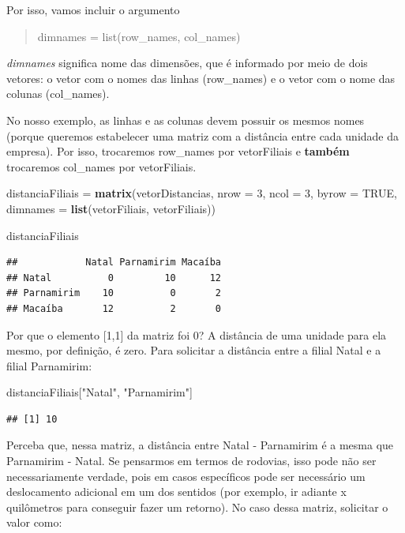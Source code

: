 \documentclass[
]{book}
\newenvironment{Shaded}{\begin{snugshade}}{\end{snugshade}}
\newcommand{\DataTypeTok}[1]{\textcolor[rgb]{0.13,0.29,0.53}{#1}}
\newcommand{\DecValTok}[1]{\textcolor[rgb]{0.00,0.00,0.81}{#1}}
\newcommand{\KeywordTok}[1]{\textcolor[rgb]{0.13,0.29,0.53}{\textbf{#1}}}
\newcommand{\NormalTok}[1]{#1}
\newcommand{\OtherTok}[1]{\textcolor[rgb]{0.56,0.35,0.01}{#1}}
\newcommand{\StringTok}[1]{\textcolor[rgb]{0.31,0.60,0.02}{#1}}
\begin{document}
Por isso, vamos incluir o argumento

\begin{quote}
dimnames = list(row\_names, col\_names)
\end{quote}

\emph{dimnames} significa nome das dimensões, que é informado por meio de dois vetores: o vetor com o nomes das linhas (row\_names) e o vetor com o nome das colunas (col\_names).

No nosso exemplo, as linhas e as colunas devem possuir os mesmos nomes (porque queremos estabelecer uma matriz com a distância entre cada unidade da empresa). Por isso, trocaremos row\_names por vetorFiliais e \textbf{também} trocaremos col\_names por vetorFiliais.

\begin{Shaded}
\begin{Highlighting}[]
\NormalTok{distanciaFiliais =}\StringTok{ }\KeywordTok{matrix}\NormalTok{(vetorDistancias, }\DataTypeTok{nrow =} \DecValTok{3}\NormalTok{, }\DataTypeTok{ncol =} \DecValTok{3}\NormalTok{, }\DataTypeTok{byrow =} \OtherTok{TRUE}\NormalTok{,}
             \DataTypeTok{dimnames =} \KeywordTok{list}\NormalTok{(vetorFiliais, vetorFiliais))}

\NormalTok{distanciaFiliais}
\end{Highlighting}
\end{Shaded}

\begin{verbatim}
##            Natal Parnamirim Macaíba
## Natal          0         10      12
## Parnamirim    10          0       2
## Macaíba       12          2       0
\end{verbatim}

Por que o elemento {[}1,1{]} da matriz foi 0? A distância de uma unidade para ela mesmo, por definição, é zero. Para solicitar a distância entre a filial Natal e a filial Parnamirim:

\begin{Shaded}
\begin{Highlighting}[]
\NormalTok{distanciaFiliais[}\StringTok{"Natal"}\NormalTok{, }\StringTok{"Parnamirim"}\NormalTok{]}
\end{Highlighting}
\end{Shaded}

\begin{verbatim}
## [1] 10
\end{verbatim}

Perceba que, nessa matriz, a distância entre Natal - Parnamirim é a mesma que Parnamirim - Natal. Se pensarmos em termos de rodovias, isso pode não ser necessariamente verdade, pois em casos específicos pode ser necessário um deslocamento adicional em um dos sentidos (por exemplo, ir adiante x quilômetros para conseguir fazer um retorno). No caso dessa matriz, solicitar o valor como:
\end{document}

